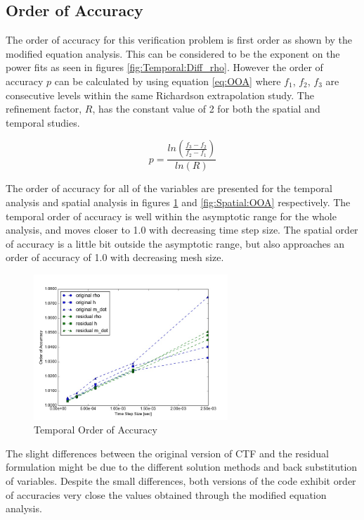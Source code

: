 \documentclass{mc2015}
\begin{document}
\subsection{Order of Accuracy}

The order of accuracy for this verification problem is first order as shown by
the modified equation analysis. This can be considered to be the exponent on
the power fits as seen in figures \ref{fig:Temporal:Diff_rho}. However the order
of accuracy $p$ can be calculated by using equation \ref{eq:OOA} where $f_{1}$,
$f_{2}$, $f_{3}$ are consecutive levels within the same Richardson extrapolation
study. The refinement factor, $R$, has the constant value of 2 for both the
spatial and temporal studies.

\begin{equation}
	\label{eq:OOA}
	p= \frac{
	      	ln \left(
	      	\frac{f_{3}-f_{2}}{f_{2}-f_{1}}
	      	\right)
	    }{ln(R)}
\end{equation}

The order of accuracy for all of the variables are presented for the temporal
analysis and spatial analysis in figures \ref{fig:Temporal:OOA} and
\ref{fig:Spatial:OOA} respectively. The temporal order of accuracy is well
within the asymptotic range for the whole analysis, and moves closer to 1.0 with
decreasing time step size. The spatial order of accuracy is a little bit outside
the asymptotic range, but also approaches an order of accuracy of 1.0 with
decreasing mesh size. 

\begin{figure}[!h]
	\centering
	\includegraphics[width=0.65\textwidth]{images/Temporal_Study/Order_Of_Accuracy_Summary}
	\caption{Temporal Order of Accuracy}
	\label{fig:Temporal:OOA}
\end{figure}

The slight differences between the original version of CTF and the residual
formulation might be due to the different solution methods and back substitution
of variables. Despite the small differences, both versions of the code exhibit
order of accuracies very close the values obtained through the modified
equation analysis.
\end{document}
